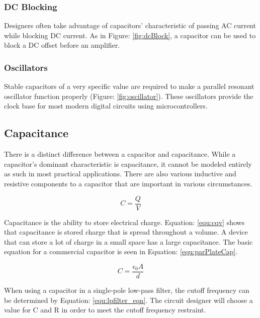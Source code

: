 \subsubsection{DC Blocking}

Designers often take advantage of capacitors' characteristic of passing AC current while blocking DC current. As in Figure: \ref{fig:dcBlock}, a capacitor can be used to block a DC offset before an amplifier.

\subsubsection{Oscillators}


Stable capacitors of a very specific value are required to make a parallel resonant oscillator function properly (Figure: \ref{fig:oscillator}). These oscillators provide the clock base for most modern digital circuits using microcontrollers.

\subsection{Capacitance}

There is a distinct difference between a capacitor and capacitance. While a capacitor's dominant characteristic is capacitance, it cannot be modeled entirely as such in most practical applications. There are also various inductive and resistive components to a capacitor that are important in various circumstances.

\begin{equation}
\label{equ:cqv}
C=\frac{Q}{V}
\end{equation}

Capacitance is the ability to store electrical charge. Equation: \eqref{equ:cqv} shows that capacitance is stored charge that is spread throughout a volume. A device that can store a lot of charge in a small space has a large capacitance. The basic equation for a commercial capacitor is seen in Equation: \eqref{equ:parPlateCap}.

\begin{equation}
\label{equ:parPlateCap}
C = \frac{\epsilon _0 A}{d}
\end{equation}

When using a capacitor in a single-pole low-pass filter, the cutoff frequency can be determined by Equation: \eqref{equ:lpfilter_eqn}. The circuit designer will choose a value for C and R in order to meet the cutoff frequency restraint.

